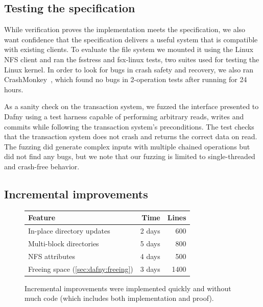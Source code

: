 \subsection{Testing the specification}

While verification proves the implementation meets the specification, we also
want confidence that the specification delivers a useful system that is
compatible with existing clients. To evaluate the file system we mounted it
using the Linux NFS client and ran the fsstress and fsx-linux tests, two suites
used for testing the Linux kernel. In order to look for bugs in crash safety and
recovery, we also ran CrashMonkey~\cite{mohan:crashmonkey}, which found no bugs
in 2-operation tests after running for 24 hours.

As a sanity check on the transaction system, we fuzzed the interface presented
to Dafny using a test harness capable of performing arbitrary reads, writes and
commits while following the transaction system's preconditions. The test checks
that the transaction system does not crash and returns the correct data on read.
The fuzzing did generate complex inputs with multiple chained operations but did
not find any bugs, but we note that our fuzzing is limited to
single-threaded and crash-free behavior.

\subsection{Incremental improvements}
\label{sec:eval:incremental}

\begin{figure}
  \begin{center}
\begin{tabular}{lrr}
  \toprule
  \textbf{Feature} & \textbf{Time} & \textbf{Lines} \\
  \midrule
  In-place directory updates & 2 days & 600\\
  Multi-block directories & 5 days & 800 \\
  NFS attributes & 4 days & 500 \\
  Freeing space (\autoref{sec:dafny:freeing}) & 3 days & 1400\\
  \bottomrule
\end{tabular}
\end{center}
\caption{Incremental improvements were implemented quickly and without much
  code (which includes both implementation and proof).}
\label{fig:features}
\end{figure}


